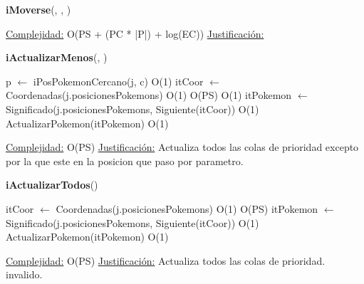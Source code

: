\begin{algorithm}[H]{\textbf{iMoverse}(, , )}{}
\begin{algorithmic}
\medskip
\Statex \underline{Complejidad:} O(PS + (PC * |P|) + log(EC))
\Statex \underline{Justificación:}
\end{algorithmic}
\end{algorithm}

\begin{algorithm}[H]{\textbf{iActualizarMenos}(, )} 
	\begin{algorithmic}
    \State p $\gets$ iPosPokemonCercano(j, c)	\Comment O(1)
		\State itCoor $\gets$ Coordenadas(j.posicionesPokemons)	\Comment O(1)
			\Comment O(PS)
				\Comment O(1)
				\State itPokemon $\gets$ Significado(j.posicionesPokemons, Siguiente(itCoor))	\Comment O(1)
					\State ActualizarPokemon(itPokemon)	\Comment O(1)
			\EndIf
		\EndWhile

	
		\medskip
		\Statex \underline{Complejidad:} O(PS)
		\Statex \underline{Justificación:} Actualiza todos las colas de prioridad excepto por la que este en la posicion que paso por parametro.
    \end{algorithmic}
\end{algorithm}

\begin{algorithm}[H]{\textbf{iActualizarTodos}()} 
	\begin{algorithmic}
		\State itCoor $\gets$ Coordenadas(j.posicionesPokemons)	\Comment O(1)
			\Comment O(PS)
			\State itPokemon $\gets$ Significado(j.posicionesPokemons, Siguiente(itCoor))	\Comment O(1)
				\State ActualizarPokemon(itPokemon)	\Comment O(1)
		\EndWhile

	
		\medskip
		\Statex \underline{Complejidad:} O(PS)
		\Statex \underline{Justificación:} Actualiza todos las colas de prioridad. invalido.
    \end{algorithmic}
\end{algorithm}

